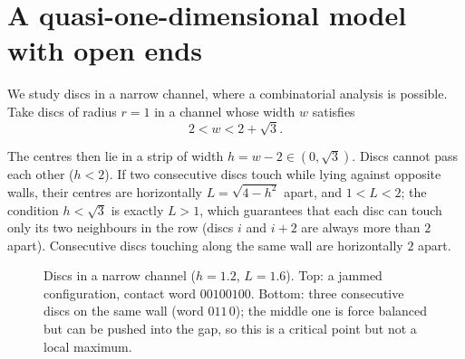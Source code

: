\section{A quasi-one-dimensional model with open ends}
\label{L11:sec:channel}

We study discs in a narrow channel, where a combinatorial analysis is possible. Take discs of radius $r=1$ in a channel whose width $w$ satisfies
\[
2<w<2+\sqrt3 .
\]
\begin{addedblock}
The centres then lie in a strip of width $h=w-2\in(0,\sqrt3)$. Discs cannot pass each other ($h<2$). If two consecutive discs touch while lying against opposite walls, their centres are horizontally $L=\sqrt{4-h^2}$ apart, and $1<L<2$; the condition $h<\sqrt3$ is exactly $L>1$, which guarantees that each disc can touch only its two neighbours in the row (discs $i$ and $i+2$ are always more than $2$ apart). Consecutive discs touching along the same wall are horizontally $2$ apart.
\end{addedblock}

\begin{figure}[ht]
\centering
{}

\vspace{2ex}
\caption{Discs in a narrow channel ($h=1.2$, $L=1.6$). Top: a jammed configuration, contact word $00100100$. Bottom: three consecutive discs on the same wall (word $011\,0$); the middle one is force balanced but can be pushed into the gap, so this is a critical point but not a local maximum.}
\label{L11:fig:channel}
\end{figure}

